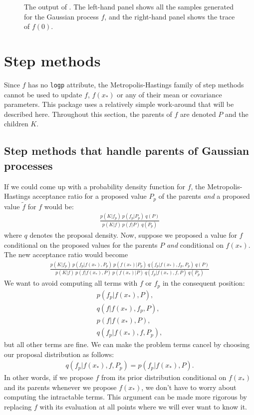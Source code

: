 \begin{figure}
    \centering
    \caption{The output of . The left-hand panel shows all the samples generated for the Gaussian process $f$, and the right-hand panel shows the trace of $f(0)$.}
    \label{fig:MCMCOutput}
\end{figure}






\section{Step methods}
\label{sec:step-methods} 
Since $f$ has no \texttt{logp} attribute, the Metropolis-Hastings family of step methods cannot be used to update $f$, $f(x_*)$ or any of their mean or covariance parameters. This package uses a relatively simple work-around that will be described here. Throughout this section, the parents of $f$ are denoted $P$ and the children $K$.


\subsection{Step methods that handle parents of Gaussian processes}
If we could come up with a probability density function for $f$, the Metropolis-Hastings acceptance ratio for a proposed value $P_p$ of the parents \emph{and} a proposed value $\tilde f$ for $f$ would be:
\begin{eqnarray*}
    \frac{p(K|f_p)\ p(f_p|P_p)\ q(P)}{p(K|f)\ p(f|P)\ q(P_p)}
\end{eqnarray*}
where $q$ denotes the proposal density. Now, suppose we proposed a value for $f$ conditional on the proposed values for the parents $P$ \emph{and} conditional on $f(x_*)$. The new acceptance ratio would become
\begin{eqnarray*}
    \frac{p(K|f_p)\ p(f_p|f(x_*), P_p)\ p(f(x_*) | P_p)\ q(f_p|f(x_*),f_p, P_p)\ q(P)}{p(K|f)\ p(f|f(x_*), P)\ p(f(x_*) | P)\ q(f_p|f(x_*),f,P)\ q(P_p)}
\end{eqnarray*}
 We want to avoid computing all terms with $f$ or $f_p$ in the consequent position:
\begin{eqnarray*}
    p(f_p|f(x_*), P),\\ q(f|f(x_*),f_p,P),\\ p(f|f(x_*), P),\\ q(f_p|f(x_*),f,P_p),
\end{eqnarray*}
but all other terms are fine. We can make the problem terms cancel by choosing our proposal distribution as follows:
\begin{eqnarray*}
    q(f_p|f(x_*),f,P_p) = p(f_p|f(x_*), P).
\end{eqnarray*}
In other words, if we propose $f$ from its prior distribution conditional on $f(x_*)$ and its parents whenever we propose $f(x_*)$, we don't have to worry about computing the intractable terms. This argument can be made more rigorous by replacing $f$ with its evaluation at all points where we will ever want to know it.

